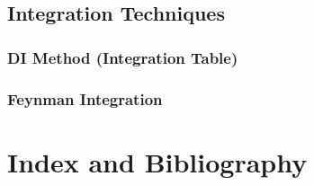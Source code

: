 \documentclass[12pt, english]{book}
\begin{document}
	\chapter{Integration Techniques} \label{Integration Techniques Chapter - Tips and Tricks}
	
	\section{DI Method (Integration Table)} \label{DI Method Section - Tips and Tricks}
	
	\section{Feynman Integration} \label{Feynman Integration Section - Tips and Tricks}
	
	\backmatter
	\part{Index and Bibliography} \label{Index and Bibliography Part}
	
	\printindex
	
	
	\typeout{}
	
	
\end{document}
